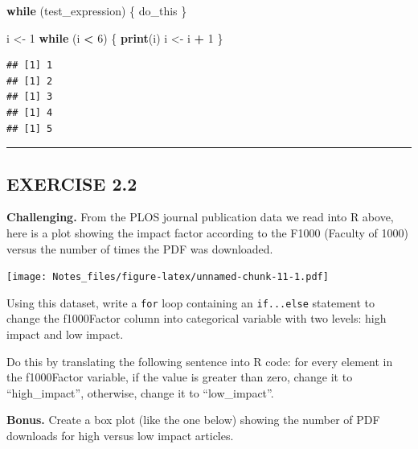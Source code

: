 \documentclass[
]{book}
\newenvironment{Shaded}{\begin{snugshade}}{\end{snugshade}}
\newcommand{\ControlFlowTok}[1]{\textcolor[rgb]{0.13,0.29,0.53}{\textbf{#1}}}
\newcommand{\DecValTok}[1]{\textcolor[rgb]{0.00,0.00,0.81}{#1}}
\newcommand{\KeywordTok}[1]{\textcolor[rgb]{0.13,0.29,0.53}{\textbf{#1}}}
\newcommand{\NormalTok}[1]{#1}
\newcommand{\OperatorTok}[1]{\textcolor[rgb]{0.81,0.36,0.00}{\textbf{#1}}}
\newcommand{\StringTok}[1]{\textcolor[rgb]{0.31,0.60,0.02}{#1}}
\begin{document}
\begin{Shaded}
\begin{Highlighting}[]
\ControlFlowTok{while}\NormalTok{ (test_expression) \{}
\NormalTok{  do_this}
\NormalTok{\}}
\end{Highlighting}
\end{Shaded}

\begin{Shaded}
\begin{Highlighting}[]
\NormalTok{i <-}\StringTok{ }\DecValTok{1}
\ControlFlowTok{while}\NormalTok{ (i }\OperatorTok{<}\StringTok{ }\DecValTok{6}\NormalTok{) \{}
  \KeywordTok{print}\NormalTok{(i)}
\NormalTok{  i <-}\StringTok{ }\NormalTok{i }\OperatorTok{+}\StringTok{ }\DecValTok{1}
\NormalTok{\}}
\end{Highlighting}
\end{Shaded}

\begin{verbatim}
## [1] 1
## [1] 2
## [1] 3
## [1] 4
## [1] 5
\end{verbatim}

\begin{center}\rule{0.5\linewidth}{0.5pt}\end{center}

\hypertarget{exercise-2.2}{%
\subsection*{EXERCISE 2.2}\label{exercise-2.2}}

\textbf{Challenging.} From the PLOS journal publication data we read into R above, here is a plot showing the impact factor according to the F1000 (Faculty of 1000) versus the number of times the PDF was downloaded.

\texttt{[image: Notes\_files/figure-latex/unnamed-chunk-11-1.pdf]}

Using this dataset, write a \texttt{for} loop containing an \texttt{if...else} statement to change the f1000Factor column into categorical variable with two levels: high impact and low impact.

Do this by translating the following sentence into R code: for every element in the f1000Factor variable, if the value is greater than zero, change it to ``high\_impact'', otherwise, change it to ``low\_impact''.

\textbf{Bonus.} Create a box plot (like the one below) showing the number of PDF downloads for high versus low impact articles.
\end{document}
